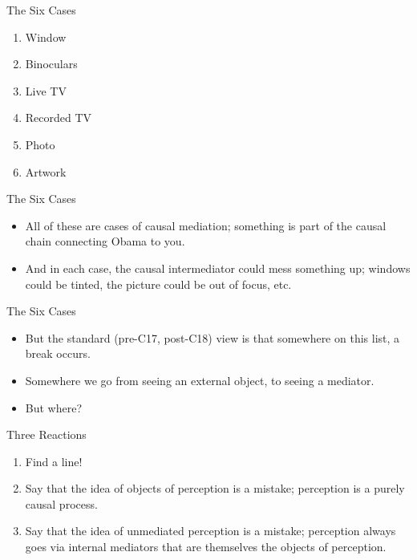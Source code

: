 \documentclass[
  17pt,
  letterpaper,
  ignorenonframetext,
  aspectratio=169,
  handout]{beamer}
\providecommand{\tightlist}{%
  \setlength{\itemsep}{0pt}\setlength{\parskip}{0pt}}\usepackage{longtable,booktabs,array}
\begin{document}
\begin{frame}{The Six Cases}
\protect\hypertarget{the-six-cases}{}
\begin{enumerate}[<+->]
\tightlist
\item
  Window
\item
  Binoculars
\item
  Live TV
\item
  Recorded TV
\item
  Photo
\item
  Artwork
\end{enumerate}
\end{frame}

\begin{frame}{The Six Cases}
\protect\hypertarget{the-six-cases-1}{}
\begin{itemize}[<+->]
\tightlist
\item
  All of these are cases of causal mediation; something is part of the
  causal chain connecting Obama to you.
\item
  And in each case, the causal intermediator could mess something up;
  windows could be tinted, the picture could be out of focus, etc.
\end{itemize}
\end{frame}

\begin{frame}{The Six Cases}
\protect\hypertarget{the-six-cases-2}{}
\begin{itemize}[<+->]
\tightlist
\item
  But the standard (pre-C17, post-C18) view is that somewhere on this
  list, a break occurs.
\item
  Somewhere we go from seeing an external object, to seeing a mediator.
\item
  But where?
\end{itemize}
\end{frame}

\begin{frame}{Three Reactions}
\protect\hypertarget{three-reactions}{}
\begin{enumerate}[<+->]
\tightlist
\item
  Find a line!
\item
  Say that the idea of objects of perception is a mistake; perception is
  a purely causal process.
\item
  Say that the idea of unmediated perception is a mistake; perception
  always goes via internal mediators that are themselves the objects of
  perception.
\end{enumerate}
\end{frame}
\end{document}
